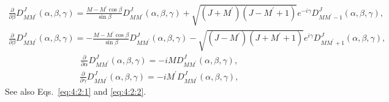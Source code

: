 \begin{align}\frac{\partial}{\partial \beta} D_{M M^{\prime}}^{J}(\alpha, \beta, \gamma)=\frac{M-M^{\prime} \cos \beta}{\sin \beta} D_{M M^{\prime}}^{J}(\alpha, \beta, \gamma)+\sqrt{\left(J+M^{\prime}\right)\left(J-M^{\prime}+1\right)} e^{-i \gamma} D_{M M^{\prime}-1}^{J}(\alpha, \beta, \gamma)  ,\label{eq:4:9:6}
\end{align}
\begin{align}\frac{\partial}{\partial \beta} D_{M M^{\prime}}^{J}(\alpha, \beta, \gamma)=-\frac{M-M^{\prime} \cos \beta}{\sin \beta} D_{M M^{\prime}}^{J}(\alpha, \beta, \gamma)-\sqrt{\left(J-M^{\prime}\right)\left(J+M^{\prime}+1\right)} e^{i \gamma} D_{M M^{\prime}+1}^{J}(\alpha, \beta, \gamma)  ,\label{eq:4:9:7}
\end{align}
\begin{align}\frac{\partial}{\partial \alpha} D_{M M^{\prime}}^{J}(\alpha, \beta, \gamma)=-i M D_{M M^{\prime}}^{J}(\alpha, \beta, \gamma) , \label{eq:4:9:8}
\end{align}
\begin{align}\frac{\partial}{\partial \gamma} D_{M M^{\prime}}^{J}(\alpha, \beta, \gamma)=-i M^{\prime} D_{M M^{\prime}}^{J}(\alpha, \beta, \gamma) ,\label{eq:4:9:9}
\end{align}
See also Eqs.~\eqref{eq:4:2:1} and \eqref{eq:4:2:2}.

